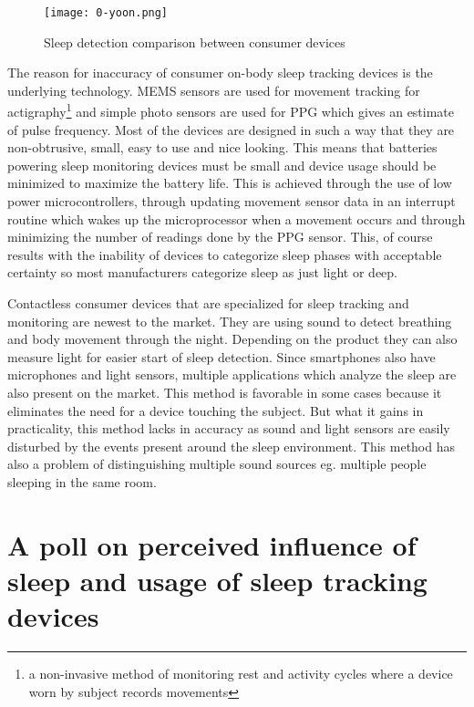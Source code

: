 \begin{figure}[h]
  \begin{center}
    \texttt{[image: 0-yoon.png]}
  \end{center}
  \caption{Sleep detection comparison between consumer devices}
  \label{fig:yoon}
\end{figure}

The reason for inaccuracy of consumer on-body sleep tracking devices is the underlying technology. \ac{MEMS} sensors are used for movement tracking for actigraphy\footnote{a non-invasive method of monitoring rest and activity cycles where a device worn by subject records movements} and simple photo sensors are used for \ac{PPG} which gives an estimate of pulse frequency. Most of the devices are designed in such a way that they are non-obtrusive, small, easy to use and nice looking. This means that batteries powering sleep monitoring devices must be small and device usage should be minimized to maximize the battery life. This is achieved through the use of low power microcontrollers, through updating movement sensor data in an interrupt routine which wakes up the microprocessor when a movement occurs and through minimizing the number of readings done by the \ac{PPG} sensor. This, of course results with the inability of devices to categorize sleep phases with acceptable certainty so most manufacturers categorize sleep as just light or deep.

Contactless consumer devices that are specialized for sleep tracking and monitoring are newest to the market. They are using sound to detect breathing and body movement through the night. Depending on the product they can also measure light for easier start of sleep detection. Since smartphones also have microphones and light sensors, multiple applications which analyze the sleep are also present on the market. This method is favorable in some cases because it eliminates the need for a device touching the subject. But what it gains in practicality, this method lacks in accuracy as sound and light sensors are easily disturbed by the events present around the sleep environment. This method has also a problem of distinguishing multiple sound sources eg. multiple people sleeping in the same room.


\section{A poll on perceived influence of sleep and usage of sleep tracking devices}

